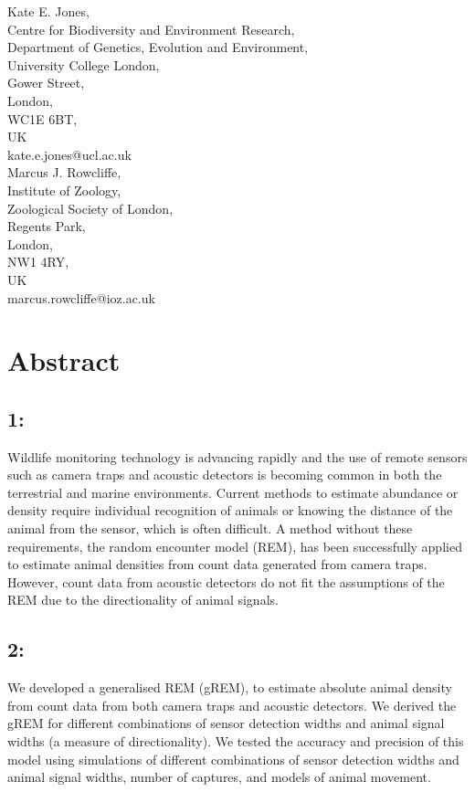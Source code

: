 \documentclass[a4paper,10pt,reqno,oneside]{amsart}
\begin{document}
\noindent 
Kate E. Jones,\\
Centre for Biodiversity and Environment Research,\\
Department of Genetics, Evolution and Environment,\\
University College London,\\
Gower Street,\\
London,\\
WC1E 6BT, \\
UK\\
kate.e.jones@ucl.ac.uk\\

\noindent 
Marcus J. Rowcliffe, \\
Institute of Zoology, \\
Zoological Society of London, \\
Regents Park, \\
London, \\
NW1 4RY, \\
UK \\
marcus.rowcliffe@ioz.ac.uk


\clearpage



\section*{Abstract}
\subsection*{1:}  Wildlife monitoring technology is advancing rapidly and the use of remote sensors such as camera traps and acoustic detectors is becoming common in both the terrestrial and marine environments. Current methods to estimate abundance or density require individual recognition of animals or knowing the distance of the animal from the sensor, which is often difficult. A method without these requirements, the random encounter model (REM), has been successfully applied to estimate animal densities from count data generated from camera traps. However, count data from acoustic detectors do not fit the assumptions of the REM due to the directionality of animal signals.

\subsection*{2:} We developed a generalised REM (gREM), to estimate absolute animal density from count data from both camera traps and acoustic detectors. We derived the gREM for different combinations of sensor detection widths and animal signal widths (a measure of directionality). We tested the accuracy and precision of this model using simulations of different combinations of sensor detection widths and animal signal widths, number of captures, and models of animal movement. 
\end{document}
